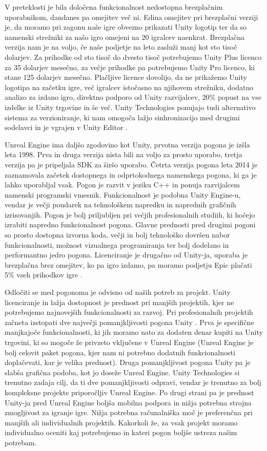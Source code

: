 \documentclass[12pt,a4paper,twoside]{book}
\begin{document}
V preteklosti je bila določena funkcionalnost nedostopna brezplačnim uporabnikom, dandanes pa omejitev več ni. Edina omejitev pri brezplačni verziji je, da moramo pri zagonu naše igre obvezno prikazati Unity logotip ter da so namenski strežniki za našo igro omejeni na 20 igralcev naenkrat. Brezplačna verzija nam je na voljo, če naše podjetje na leto zasluži manj kot sto tisoč dolarjev. Za prihodke od sto tisoč do dvesto tisoč potrebujemo Unity Plus licenco za 35 dolarjev mesečno, za večje prihodke pa potrebujemo Unity Pro licenco, ki stane 125 dolarjev mesečno. Plačljive licence dovolijo, da ne prikažemo Unity logotipa na začetku igre, več igralcev istočasno na njihovem strežniku, dodatno analizo za izdano igro, direktno podporo od Unity razvijalcev, 20\% popust na vse izdelke iz Unity trgovine in še več. Unity Technologies ponujajo tudi alternativo sistema za verzioniranje, ki nam omogoča lažjo sinhronizacijo med drugimi sodelavci in je vgrajen v Unity Editor \cite{unityFeatures}.

Unreal Engine ima daljšo zgodovino kot Unity, prvotna verzija pogona je izšla leta 1998. Prva in druga verzija nista bili na voljo za prosto uporabo, tretja verzija pa je pripeljala SDK za širšo uporabo. Četrta verzija pogona leta 2014 je zaznamovala začetek dostopnega in odprtokodnega namenskega pogona, ki ga je lahko uporabljal vsak. Pogon je razvit v jeziku C++ in ponuja razvijalcem namenski programski vmesnik. Funkcionalnost je podobna Unity Engine-u, vendar je večji poudarek na tehnološkem napredku in naprednih grafičnih izrisovanjih. Pogon je bolj priljubljen pri večjih profesionalnih studiih, ki hočejo izrabiti napredno funkcionalnost pogona. Glavne prednosti pred drugimi pogoni so prosto dostopna izvorna koda, večji in bolj tehnološko dovršen nabor funkcionalnosti, možnost vizualnega programiranja ter bolj dodelano in performantno jedro pogona. Licenciranje je drugačno od Unity-ja, uporaba je brezplačna brez omejitev, ko pa igro izdamo, pa moramo podjetju Epic plačati 5\% vseh prihodkov igre \cite{unrealEngine}. 

Odločiti se med pogonoma je odvisno od naših potreb za projekt. Unity licenciranje in lažja dostopnost je prednost pri manjših projektih, kjer ne potrebujemo najnovejših funkcionalnosti za razvoj. Pri profesionalnih projektih začneta izstopati dve največji pomanjkljivosti pogona Unity . Prva je specifične manjkajoče funkcionalnosti, ki jih moramo nato za dodaten denar kupiti na Unity trgovini, ki so mogoče že privzeto vključene v Unreal Engine (Unreal Engine je bolj celovit paket pogona, kjer nam ni potrebno dodatnih funkcionalnosti doplačevati, kar je velika prednost). Druga pomanjkljivost pogona Unity  pa je slabša grafična podoba, kot jo doseže Unreal Engine. Unity Technologies si trenutno zadaja cilj, da ti dve pomanjkljivosti odpravi, vendar je trenutno za bolj kompleksne projekte priporočljiv Unreal Engine. Po drugi strani pa je prednost Unity-ja pred Unreal Engine boljša mobilna podpora in nižja potrebna strojna zmogljivost za igranje igre. Nižja potrebna računalniška moč je preferenčna pri manjših ali individualnih projektih. Kakorkoli že, za vsak projekt moramo individualno oceniti kaj potrebujemo in kateri pogon boljše ustreza našim potrebam.
	
\end{document}

